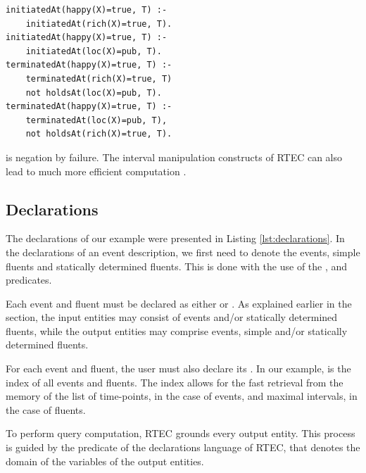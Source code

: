 {\small
\begin{verbatim}
initiatedAt(happy(X)=true, T) :- 
    initiatedAt(rich(X)=true, T).
initiatedAt(happy(X)=true, T) :-
    initiatedAt(loc(X)=pub, T).
terminatedAt(happy(X)=true, T) :-
    terminatedAt(rich(X)=true, T)
    not holdsAt(loc(X)=pub, T).
terminatedAt(happy(X)=true, T) :-
    terminatedAt(loc(X)=pub, T),
    not holdsAt(rich(X)=true, T).
\end{verbatim}
}

 is negation by failure. The interval manipulation constructs of RTEC can also lead to much more efficient computation \cite{DBLP:journals/tkde/ArtikisSP15}.

\subsection{Declarations}\label{sec:declarations}

The declarations of our example were presented in Listing \ref{lst:declarations}.
In the declarations of an event description, we first need to denote the events, simple fluents and statically determined fluents. This is done with the use of the ,   and  predicates.


Each event and fluent must be declared as either  or . As explained earlier in the section, the input entities may consist of events and/or statically determined fluents, while the output entities may comprise events, simple and/or statically determined fluents.

For each event and fluent, the user must also declare its . In our example,  is the index of all events and fluents. The index allows for the fast retrieval from the memory of the list of time-points, in the case of events, and maximal intervals, in the case of fluents. 


To perform query computation, RTEC grounds every output entity. This process is guided by the  predicate of the declarations language of RTEC, that denotes the domain of the variables of the output entities.  

